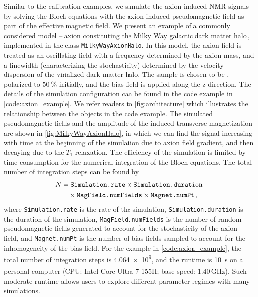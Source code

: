 \documentclass[%
 reprint,
nofootinbib,
 amsmath,amssymb,
 aps,
]{revtex4-2}
\begin{document}
Similar to the calibration examples, we simulate the axion-induced NMR signals by solving the Bloch equations with the axion-induced pseudomagnetic field as part of the effective magnetic field. 
We present an example of a commonly considered model -- axion constituting the Milky Way galactic dark matter halo\,\cite{Evans2019_SHMRefined,Gramolin2022Feb_SpectralSignatures}, implemented in the class \texttt{MilkyWayAxionHalo}. 
In this model, the axion field is treated as an oscillating field with a frequency determined by the axion mass, and a linewidth (characterizing the stochasticity) determined by the velocity dispersion of the virialized dark matter halo. 
The sample is chosen to be , polarized to $\SI{50}{\%}$ initially, and the bias field is applied along the z direction. 
The details of the simulation configuration can be found in the code example in \cref{code:axion_example}. 
We refer readers to \cref{fig:architecture} which illustrates the relationship between the objects in the code example. 
The simulated pseudomagnetic fields and the amplitude of the induced transverse magnetization are shown in \cref{fig:MilkyWayAxionHalo}, in which we can find the signal increasing with time at the beginning of the simulation due to axion field gradient, and then decaying due to the $T_1$ relaxation. 
The efficiency of the simulation is limited by time consumption for the numerical integration of the Bloch equations. 
The total number of integration steps can be found by
\begin{align}
    N &= \text{\texttt{Simulation.rate}} \times \text{\texttt{Simulation.duration}} \nonumber\\
    &\quad \times \text{\texttt{MagField.numFields}} \times \text{\texttt{Magnet.numPt}}\,,
\end{align}
where \texttt{Simulation.rate} is the rate of the simulation, \texttt{Simulation.duration} is the duration of the simulation, \texttt{MagField.numFields} is the number of random pseudomagnetic fields generated to account for the stochasticity of the axion field, and \texttt{Magnet.numPt} is the number of bias fields sampled to account for the inhomogeneity of the bias field.
For the example in \cref{code:axion_example}, the total number of integration steps is \SI{4.064e9}{}, and the runtime is \SI{10}{\s} on a personal computer (CPU: Intel\textsuperscript{\textregistered} Core\textsuperscript{\texttrademark} Ultra 7 155H; base speed: 1.40\,GHz). 
Such moderate runtime allows users to explore different parameter regimes with many simulations. 
\end{document}
